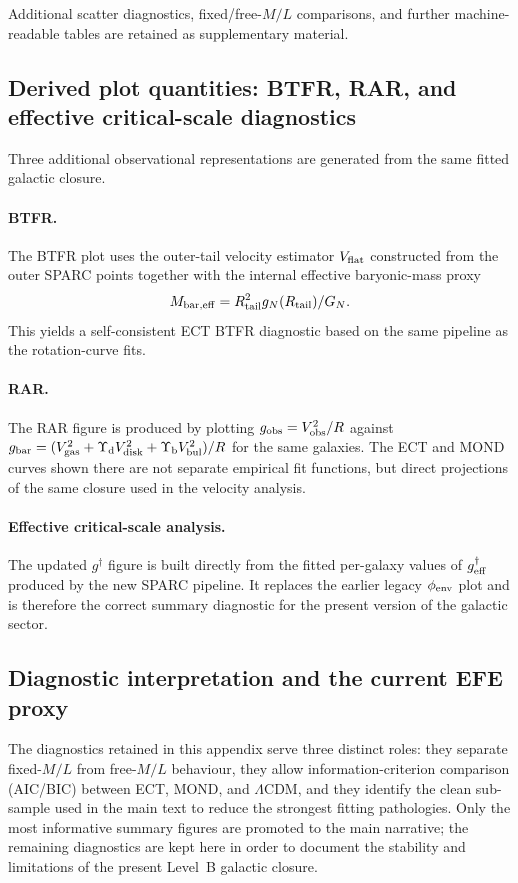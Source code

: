 \documentclass[11pt,a4paper]{article}
\numberwithin{equation}{section}
\begin{document}
Additional scatter diagnostics, fixed/free-$M/L$ comparisons, and
further machine-readable tables are retained as supplementary material.

\subsection{Derived plot quantities: BTFR, RAR, and effective critical-scale diagnostics}

Three additional observational representations are generated from the
same fitted galactic closure.

\paragraph{BTFR.}
The BTFR plot uses the outer-tail velocity estimator $V_{\rm flat}$
constructed from the outer SPARC points together with the internal
effective baryonic-mass proxy
\[
M_{\rm bar,eff}=R_{\rm tail}^2 g_N(R_{\rm tail})/G_N.
\]
This yields a self-consistent ECT BTFR diagnostic based on the same
pipeline as the rotation-curve fits.

\paragraph{RAR.}
The RAR figure is produced by plotting
$g_{\rm obs}=V_{\rm obs}^2/R$ against
$g_{\rm bar}=(V_{\rm gas}^2+\Upsilon_{\rm d}V_{\rm disk}^2+\Upsilon_{\rm b}V_{\rm bul}^2)/R$
for the same galaxies.  The ECT and MOND curves shown there are not
separate empirical fit functions, but direct projections of the same
closure used in the velocity analysis.

\paragraph{Effective critical-scale analysis.}
The updated $g^\dagger$ figure is built directly from the fitted
per-galaxy values of $g^\dagger_{\rm eff}$ produced by the new SPARC
pipeline.  It replaces the earlier legacy $\phi_{\rm env}$ plot and is
therefore the correct summary diagnostic for the present version of the
galactic sector.

\subsection{Diagnostic interpretation and the current EFE proxy}

The diagnostics retained in this appendix serve three distinct roles:
they separate fixed-$M/L$ from free-$M/L$ behaviour, they allow
information-criterion comparison (AIC/BIC) between ECT, MOND, and
$\Lambda$CDM, and they identify the clean sub-sample used in the main
text to reduce the strongest fitting pathologies.  Only the most
informative summary figures are promoted to the main narrative; the
remaining diagnostics are kept here in order to document the stability
and limitations of the present Level~B galactic closure.
\end{document}
